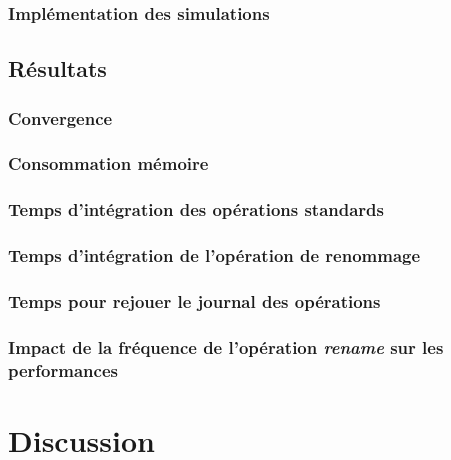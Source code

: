 \subsubsection{Implémentation des simulations}


\subsection{Résultats}


\subsubsection{Convergence}


\subsubsection{Consommation mémoire}


\subsubsection{Temps d'intégration des opérations standards}


\subsubsection{Temps d'intégration de l'opération de renommage}


\subsubsection{Temps pour rejouer le journal des opérations}


\subsubsection{Impact de la fréquence de l'opération \emph{rename} sur les performances}


\section{Discussion}

